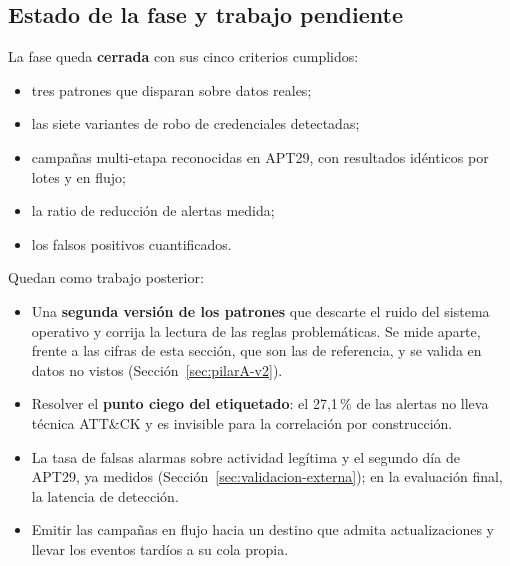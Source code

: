 \subsection{Estado de la fase y trabajo pendiente}

La fase queda \textbf{cerrada} con sus cinco criterios cumplidos:
\begin{itemize}
    \item tres patrones que disparan sobre datos reales;
    \item las siete variantes de robo de credenciales detectadas;
    \item campañas multi-etapa reconocidas en APT29, con resultados idénticos por lotes y en
    flujo;
    \item la ratio de reducción de alertas medida;
    \item los falsos positivos cuantificados.
\end{itemize}
Quedan como trabajo posterior:

\begin{itemize}
    \item Una \textbf{segunda versión de los patrones} que descarte el ruido del sistema
    operativo y corrija la lectura de las reglas problemáticas. Se mide aparte, frente a las
    cifras de esta sección, que son las de referencia, y se valida en datos no vistos
    (Sección~\ref{sec:pilarA-v2}).
    \item Resolver el \textbf{punto ciego del etiquetado}: el 27,1\,\% de las alertas no lleva
    técnica ATT\&CK y es invisible para la correlación por construcción.
    \item La tasa de falsas alarmas sobre actividad legítima y el segundo día de APT29, ya
    medidos (Sección~\ref{sec:validacion-externa}); en la evaluación final, la latencia de
    detección.
    \item Emitir las campañas en flujo hacia un destino que admita actualizaciones y llevar
    los eventos tardíos a su cola propia.
\end{itemize}
